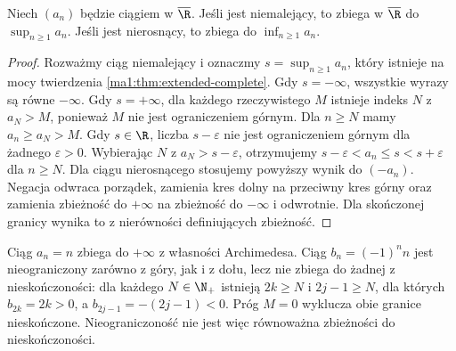\begin{lemat}
\label{ma1:lem:extended-monotone}
Niech $(a_n)$ będzie ciągiem w $\overline{\R}$. Jeśli jest niemalejący, to zbiega w $\overline{\R}$ do $\sup_{n\ge1}a_n$. Jeśli jest nierosnący, to zbiega do $\inf_{n\ge1}a_n$.
\end{lemat}
\begin{proof}
Rozważmy ciąg niemalejący i oznaczmy $s=\sup_{n\ge1}a_n$, który istnieje na mocy twierdzenia \ref{ma1:thm:extended-complete}. Gdy $s=-\infty$, wszystkie wyrazy są równe $-\infty$. Gdy $s=+\infty$, dla każdego rzeczywistego $M$ istnieje indeks $N$ z $a_N>M$, ponieważ $M$ nie jest ograniczeniem górnym. Dla $n\ge N$ mamy $a_n\ge a_N>M$. Gdy $s\in\R$, liczba $s-\varepsilon$ nie jest ograniczeniem górnym dla żadnego $\varepsilon>0$. Wybierając $N$ z $a_N>s-\varepsilon$, otrzymujemy $s-\varepsilon<a_n\le s<s+\varepsilon$ dla $n\ge N$.
Dla ciągu nierosnącego stosujemy powyższy wynik do $(-a_n)$. Negacja odwraca porządek, zamienia kres dolny na przeciwny kres górny oraz zamienia zbieżność do $+\infty$ na zbieżność do $-\infty$ i odwrotnie. Dla skończonej granicy wynika to z nierówności definiujących zbieżność.
\end{proof}
\begin{przyklad}
Ciąg $a_n=n$ zbiega do $+\infty$ z własności Archimedesa. Ciąg $b_n=(-1)^nn$ jest nieograniczony zarówno z góry, jak i z dołu, lecz nie zbiega do żadnej z nieskończoności: dla każdego $N\in\N_+$ istnieją $2k\ge N$ i $2j-1\ge N$, dla których $b_{2k}=2k>0$, a $b_{2j-1}=-(2j-1)<0$. Próg $M=0$ wyklucza obie granice nieskończone. Nieograniczoność nie jest więc równoważna zbieżności do nieskończoności.
\end{przyklad}

